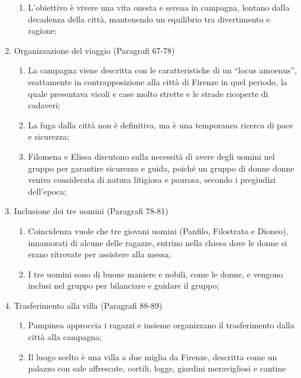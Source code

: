 \documentclass{article}
\begin{document}
\begin{enumerate}
\begin{enumerate}[label*=\arabic*.]
            \item L'obiettivo è vivere una vita onesta e serena in campagna, lontano dalla
                decadenza della città, mantenendo un equilibrio tra divertimento e ragione;
        \end{enumerate}
    \item Organizzazione del viaggio (Paragrafi 67-78)
        \begin{enumerate}[label*=\arabic*.]
            \item La campagna viene descritta con le caratteristiche di un ``locus amoenus'',
                esattamente in contrapposizione alla città di Firenze in quel periodo, la
                quale presentava vicoli e case molto strette e le strade ricoperte di cadaveri;
            \item La fuga dalla città non è definitiva, ma è una temporanea ricerca di pace e
                sicurezza;
            \item Filomena e Elissa discutono sulla necessità di avere degli uomini nel gruppo
                per garantire sicurezza e guida, poiché un gruppo di donne donne veniva
                considerata di natura litigiosa e paurosa, secondo i pregiudizi dell'epoca;
        \end{enumerate}
    \item Inclusione dei tre uomini (Paragrafi 78-81)
        \begin{enumerate}[label*=\arabic*.]
            \item Coincidenza vuole che tre giovani uomini (Panfilo, Filostrato e Dioneo),
                innamorati di alcune delle ragazze, entrino nella chiesa dove le donne si
                erano ritrovate per assistere alla messa;
            \item I tre uomini sono di buone maniere e nobili, come le donne, e vengono
                inclusi nel gruppo per bilanciare e guidare il gruppo;
        \end{enumerate}
    \item Trasferimento alla villa (Paragrafi 88-89)
        \begin{enumerate}[label*=\arabic*.]
            \item Pampinea approccia i ragazzi e insieme organizzano il trasferimento dalla
                città alla campagna;
            \item Il luogo scelto è una villa a due miglia da Firenze, descritta come un
                palazzo con sale affrescate, cortili, logge, giardini meravigliosi e cantine

\end{enumerate}
\end{enumerate}
\end{document}
